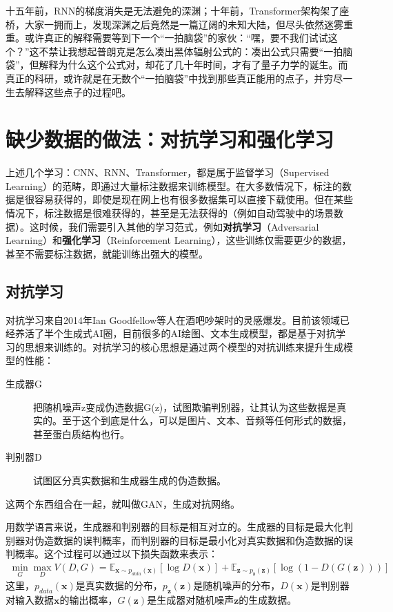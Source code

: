 十五年前，RNN的梯度消失是无法避免的深渊；十年前，Transformer架构架了座桥，大家一拥而上，发现深渊之后竟然是一篇辽阔的未知大陆，但尽头依然迷雾重重。或许真正的解释需要等到下一个“一拍脑袋”的家伙：“嘿，要不我们试试这个？”这不禁让我想起普朗克是怎么凑出黑体辐射公式的：凑出公式只需要“一拍脑袋”，但解释为什么这个公式对，却花了几十年时间，才有了量子力学的诞生。而真正的科研，或许就是在无数个“一拍脑袋”中找到那些真正能用的点子，并穷尽一生去解释这些点子的过程吧。

\section{缺少数据的做法：对抗学习和强化学习}

上述几个学习：CNN、RNN、Transformer，都是属于监督学习（Supervised Learning）的范畴，即通过大量标注数据来训练模型。在大多数情况下，标注的数据是很容易获得的，即使是现在网上也有很多数据集可以直接下载使用。但在某些情况下，标注数据是很难获得的，甚至是无法获得的（例如自动驾驶中的场景数据）。这时候，我们需要引入其他的学习范式，例如\textbf{对抗学习}（Adversarial Learning）和\textbf{强化学习}（Reinforcement Learning），这些训练仅需要更少的数据，甚至不需要标注数据，就能训练出强大的模型。

\subsection{对抗学习}

对抗学习来自2014年Ian Goodfellow等人在酒吧吵架时的灵感爆发。目前该领域已经养活了半个生成式AI圈，目前很多的AI绘图、文本生成模型，都是基于对抗学习的思想来训练的。对抗学习的核心思想是通过两个模型的对抗训练来提升生成模型的性能：
\begin{description}
    \item[生成器G] 把随机噪声z变成伪造数据G(z)，试图欺骗判别器，让其认为这些数据是真实的。至于这个到底是什么，可以是图片、文本、音频等任何形式的数据，甚至蛋白质结构也行。
    \item[判别器D] 试图区分真实数据和生成器生成的伪造数据。
\end{description}

这两个东西组合在一起，就叫做GAN，生成对抗网络。

用数学语言来说，生成器和判别器的目标是相互对立的。生成器的目标是最大化判别器对伪造数据的误判概率，而判别器的目标是最小化对真实数据和伪造数据的误判概率。这个过程可以通过以下损失函数来表示：
\begin{align*}
\min_G \max_D V(D, G) = \mathbb{E}_{\mathbf{x} \sim p_{data}(\mathbf{x})}[\log D(\mathbf{x})] + \mathbb{E}_{\mathbf{z} \sim p_{\mathbf{z}}(\mathbf{z})}[\log(1 - D(G(\mathbf{z})))]
\end{align*}
这里，$p_{data}(\mathbf{x})$是真实数据的分布，$p_{\mathbf{z}}(\mathbf{z})$是随机噪声的分布，$D(\mathbf{x})$是判别器对输入数据$\mathbf{x}$的输出概率，$G(\mathbf{z})$是生成器对随机噪声$\mathbf{z}$的生成数据。

